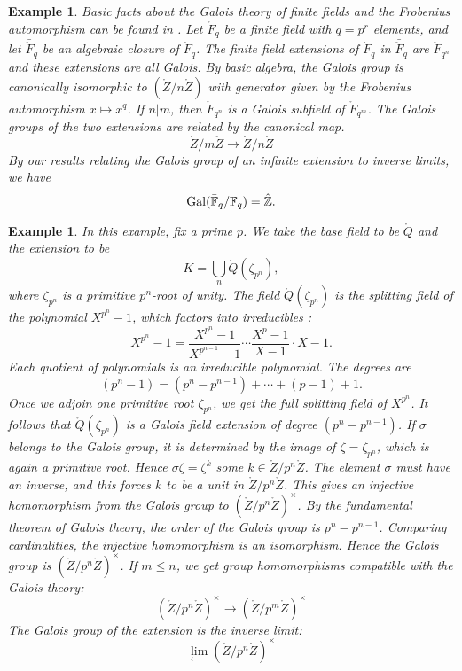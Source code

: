 \documentclass{amsart}
\newtheorem{example}[exercise]{Example}
\begin{document}
\begin{example}  
Basic facts about the Galois theory of finite fields and the Frobenius
automorphism can be found in
\cite[Chapter~IX,Prop.~9.40]{knapp-basic}.
Let $\ring{F}_q$ be a finite field with $q=p^r$ elements, and
let $\bar{\ring{F}}_q$ be an algebraic closure of $\ring{F}_q$.
The finite field extensions of $\ring{F}_q$ in $\bar{\ring{F}}_q$
are $\ring{F}_{q^n}$ and these extensions are all Galois.  
By basic algebra, the Galois group is
canonically isomorphic to $(\ring{Z}/n\ring{Z})$ with generator given by the
Frobenius automorphism $x\mapsto x^q$.  If $n|m$, then $\ring{F}_{q^n}$ is a Galois subfield
of $\ring{F}_{q^m}$.   The Galois groups of the two extensions are related by
the canonical map.
\[
\ring{Z}/m\ring{Z} \to \ring{Z}/n\ring{Z}
\]
By our results relating the Galois group of an infinite extension to inverse limits, we
have
\[
{\operatorname{Gal}}(\bar{\mathbb{F}}_q/\mathbb{F}_q) = \hat{\mathbb{Z}}.
\]
\end{example}

\begin{example} In this example, fix a prime $p$.
We take the base field to be $\ring{Q}$ and
the extension to be 
\[
K=\bigcup_n \ring{Q}(\zeta_{p^n}),
\]
where $\zeta_{p^n}$ is a primitive $p^n$-root of unity.
The field $\ring{Q}(\zeta_{p^n})$ is the splitting field of the polynomial $X^{p^n}-1$,
which factors into irreducibles \cite[Lemma~9.42]{knapp-basic}:
\[
X^{p^n}-1 = \frac{X^{p^n}-1}{X^{p^{n-1}}-1}\cdots \frac{X^p-1}{X-1} \cdot {X-1}.
\]
Each quotient of polynomials is an irreducible polynomial.  The degrees are
\[
(p^n-1) = (p^n-p^{n-1}) + \cdots + (p-1) + 1.
\]
Once we adjoin one primitive root $\zeta_{p^n}$, we get the full
splitting field of $X^{p^n}$.  It follows that $\ring{Q}(\zeta_{p^n})$
is a Galois field extension of degree $(p^n-p^{n-1})$.  If $\sigma$
belongs to the Galois group, it is determined by the image of
$\zeta=\zeta_{p^n}$, which is again a primitive root.  Hence
$\sigma\zeta = \zeta^k$ some $k\in\ring{Z}/p^n\ring{Z}$.  The element
$\sigma$ must have an inverse, and this forces $k$ to be a unit in
$\ring{Z}/p^n\ring{Z}$.  This gives an injective homomorphism from the
Galois group to $(\ring{Z}/p^n\ring{Z})^\times$.  By the fundamental
theorem of Galois theory, the order of the Galois group is $p^n
-p^{n-1}$. Comparing cardinalities, the injective homomorphism is an
isomorphism.  Hence the Galois group is
$(\ring{Z}/p^n\ring{Z})^\times$.  If $m\le n$, we get group
homomorphisms compatible with the Galois theory:
\[
(\ring{Z}/p^n\ring{Z})^\times \to (\ring{Z}/p^m\ring{Z})^\times
\]
The Galois group of the extension is the inverse limit:
\[
\lim_{\leftarrow} (\ring{Z}/p^n\ring{Z})^\times
\]
\end{example}
\end{document}
